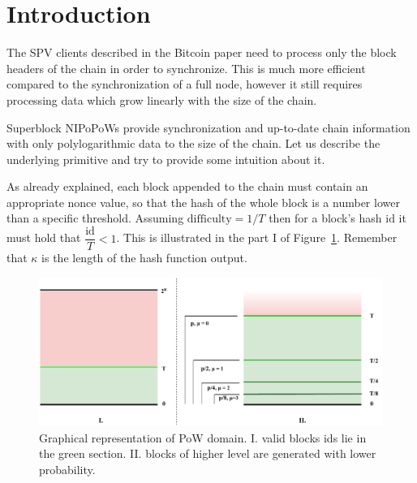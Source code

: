 \section{Introduction}
The SPV clients described in the Bitcoin paper need to process only the block headers of the chain in order to synchronize. This is much more efficient compared to the synchronization of a full node, however it still requires processing data which grow linearly with the size of the chain.

Superblock NIPoPoWs provide synchronization and up-to-date chain information with only polylogarithmic data to the size of the chain. Let us describe the underlying primitive and try to provide some intuition about it.

As already explained, each block appended to the chain must contain an appropriate nonce value, so that the hash of the whole block is a number lower than a specific threshold. Assuming $\text{difficulty} = 1/T$ then for a block's hash $\text{id}$ it must hold that $\dfrac{\text{id}}{T} < 1$. This is illustrated in the part I of Figure~\ref{fig:pow}. Remember that $\kappa$ is the length of the hash function output.

\begin{figure}[h!]
	\begin{center}
		\includegraphics[width=\columnwidth]{figures/pow.pdf}
	\end{center}
	\caption{Graphical representation of PoW domain. I. valid blocks ids lie in the green section. II. blocks of higher level are generated with lower probability.}
	\label{fig:pow}
\end{figure}

